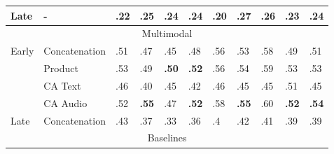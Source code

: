 \documentclass{article}
\begin{document}
\begin{table}[h]
\begin{tabular}{|lllllllllll|}
\multicolumn{1}{|l|}{Late}                   & \multicolumn{1}{l|}{-}             & .22                & .25                & .24                & .24                & .20                & .27                & .26                & \multicolumn{1}{l|}{.23}                & .24                   \\ \hline
\multicolumn{11}{|c|}{Multimodal}                                                                                                                                                                                                                                                                      \\ \hline
\multicolumn{1}{|l|}{\multirow{4}{*}{Early}} & \multicolumn{1}{l|}{Concatenation} & .51                & .47                & .45                & .48                & .56                & .53                & .58                & \multicolumn{1}{l|}{.49}                & .51                   \\
\multicolumn{1}{|l|}{}                       & \multicolumn{1}{l|}{Product}       & .53                & .49                & \textbf{.50}       & \textbf{.52}       & .56                & .54                & .59                & \multicolumn{1}{l|}{.53}                & .53                   \\
\multicolumn{1}{|l|}{}                       & \multicolumn{1}{l|}{CA Text}       & .46                & .40                & .45                & .42                & .46                & .45                & .45                & \multicolumn{1}{l|}{.51}                & .45                   \\
\multicolumn{1}{|l|}{}                       & \multicolumn{1}{l|}{CA Audio}      & .52                & \textbf{.55}       & .47                & \textbf{.52}       & .58                & \textbf{.55}       & .60                & \multicolumn{1}{l|}{\textbf{.52}}       & \textbf{.54}          \\ \hline
\multicolumn{1}{|l|}{Late}                   & \multicolumn{1}{l|}{Concatenation} & .43                & .37                & .33                & .36                & .4                 & .42                & .41                & \multicolumn{1}{l|}{.39}                & .39                   \\ \hline
\multicolumn{11}{|c|}{Baselines}                                                                                                                                                                                                                                                                       \\ \hline

\end{tabular}
\end{table}
\end{document}
